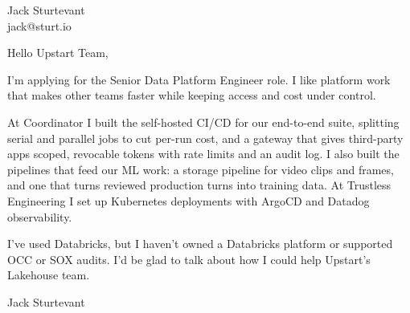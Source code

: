 \documentclass[11pt]{article}
\begin{document}
\raggedright

{\namefont\fontsize{20pt}{24pt}\selectfont Jack Sturtevant}\\[-0.3em]
jack@sturt.io

\vspace{1.2em}

Hello Upstart Team,

I'm applying for the Senior Data Platform Engineer role. I like platform work that makes other teams faster while keeping access and cost under control.

At Coordinator I built the self-hosted CI/CD for our end-to-end suite, splitting serial and parallel jobs to cut per-run cost, and a gateway that gives third-party apps scoped, revocable tokens with rate limits and an audit log. I also built the pipelines that feed our ML work: a storage pipeline for video clips and frames, and one that turns reviewed production turns into training data. At Trustless Engineering I set up Kubernetes deployments with ArgoCD and Datadog observability.

I've used Databricks, but I haven't owned a Databricks platform or supported OCC or SOX audits. I'd be glad to talk about how I could help Upstart's Lakehouse team.

\vspace{0.6em}
Jack Sturtevant
\end{document}
